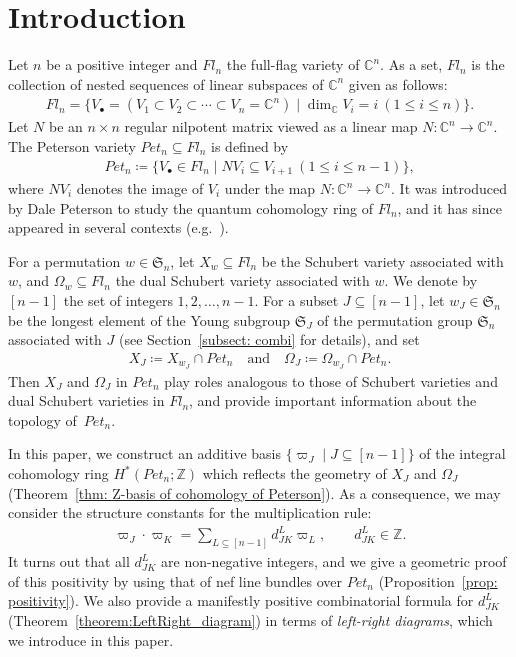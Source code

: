 \section{Introduction}
Let $n$ be a positive integer and $Fl_n$ the full-flag variety of ${\mathbb C}^n$. As a set, $Fl_n$ is the collection of nested sequences of linear subspaces of ${\mathbb C}^n$ given as follows:
\begin{align*}
 Fl_n = \{V_{\bullet}=(V_1\subset V_2\subset \cdots \subset V_{n}={\mathbb C}^n) \mid \dim_{{\mathbb C}}V_i=i \ (1\le i\le n)\}.
\end{align*}
Let $N$ be an $n\times n$ regular nilpotent matrix viewed as a linear map $N\colon {\mathbb C}^n\rightarrow {\mathbb C}^n$. The Peterson variety $Pet_{n}\subseteq Fl_n$ is defined by
\begin{align*}
 Pet_{n} \coloneqq \{V_{\bullet} \in Fl_n \mid NV_i\subseteq V_{i+1} \ (1\le i\le n-1)\},
\end{align*}
where $NV_i$ denotes the image of $V_i$ under the map $N\colon {\mathbb C}^n\rightarrow {\mathbb C}^n$. It was introduced by Dale Peterson to study the quantum cohomology ring of $Fl_n$, and it has since appeared in several contexts (e.g.\ \cite{AHMMS,Ba,ha-ho-ma,Kostant,Rietsch06}). 

For a permutation $w\in\mathfrak{S}_n$, let $X_w\subseteq Fl_n$ be the Schubert variety associated with~$w$, and $\Omega_w\subseteq Fl_n$ the dual Schubert variety associated with $w$. We denote by~$[n-1]$ the set of integers $1,2,\ldots,n-1$. For a subset $J\subseteq[n-1]$, let $w_J\in\mathfrak{S}_n$ be the longest element of the Young subgroup $\mathfrak{S}_J$ of the permutation group $\mathfrak{S}_n$ associated with $J$ (see Section~\ref{subsect: combi} for details), and set
\begin{align*}
X_{J} 
\coloneqq X_{w_J}\cap Pet_{n} \quad \text{and} \quad \Omega_{J} 
\coloneqq \Omega_{w_J}\cap Pet_{n}.
\end{align*}
Then $X_J$ and $\Omega_J$ in $Pet_{n}$ play roles analogous to those of Schubert varieties and dual Schubert varieties in $Fl_n$, and provide important information about the topology of~$Pet_{n}$.

In this paper, we construct an additive basis $\{\varpi_J\mid J\subseteq[n-1]\}$ of the integral cohomology ring $H^*(Pet_{n};{\mathbb Z})$ which reflects the geometry of $X_J$ and $\Omega_J$ (Theorem~\ref{thm: Z-basis of cohomology of Peterson}). As a consequence, we may consider the structure constants for the multiplication rule:
\begin{align}\label{intro:100}
 \varpi_J\cdot \varpi_K = \sum_{L\subseteq[n-1]} d_{JK}^L \varpi_L , \qquad d_{JK}^L\in {\mathbb Z}.
\end{align}
It turns out that all $d_{JK}^L$ are non-negative integers, and we give a geometric proof of this positivity by using that of nef line bundles over $Pet_{n}$ (Proposition~\ref{prop: positivity}). We also provide a manifestly positive combinatorial formula for $d_{JK}^L$ (Theorem~\ref{theorem:LeftRight_diagram}) in terms of \textit{left-right diagrams}, which we introduce in this paper. 


